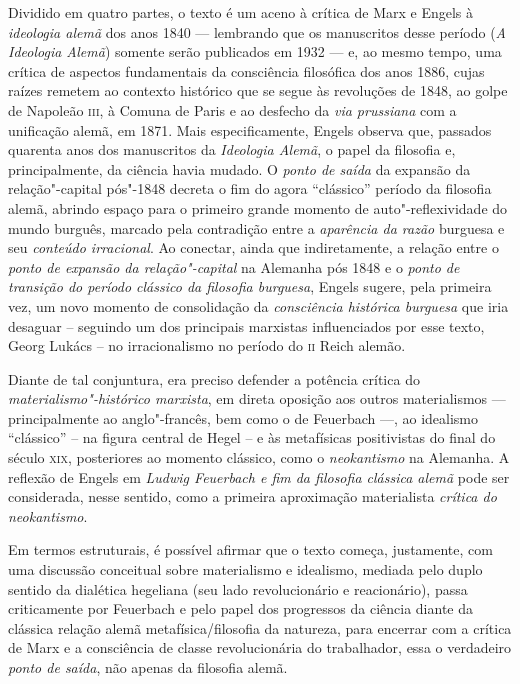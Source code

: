 Dividido em quatro partes, o texto é um aceno à
crítica de Marx e Engels à \emph{ideologia alemã} dos anos 1840 ---
lembrando que os manuscritos desse período (\emph{A Ideologia
Alemã}) somente serão publicados em 1932 --- e, ao mesmo tempo, uma crítica de aspectos
fundamentais da consciência filosófica dos anos 1886, cujas raízes remetem ao contexto histórico que se segue às
revoluções de 1848, ao golpe de Napoleão \textsc{iii}, à Comuna de Paris e
ao desfecho da \emph{via prussiana} com a unificação alemã, em 1871. Mais especificamente, Engels observa que, passados quarenta anos dos manuscritos da \emph{Ideologia Alemã}, o
papel da filosofia e, principalmente, da ciência havia mudado. O
\emph{ponto de saída} da expansão da relação"-capital pós"-1848 decreta o
fim do agora ``clássico'' período da filosofia alemã, abrindo espaço para
o primeiro grande momento de auto"-reflexividade do mundo burguês, marcado pela contradição entre a 
\emph{aparência da razão} burguesa e seu \emph{conteúdo irracional}. Ao
conectar, ainda que indiretamente, a relação entre o \emph{ponto de
expansão da relação"-capital} na Alemanha pós 1848 e o \emph{ponto de
transição do período clássico da filosofia burguesa}, Engels sugere,
pela primeira vez, um novo momento de consolidação da \emph{consciência
histórica burguesa} que iria desaguar -- seguindo um dos principais
marxistas influenciados por esse texto, Georg Lukács -- no irracionalismo
no período do \textsc{ii} Reich alemão.

Diante de tal conjuntura, era preciso defender a potência crítica do
\emph{materialismo"-histórico marxista}, em direta oposição aos outros
materialismos --- principalmente ao anglo"-francês, bem como o de Feuerbach ---, ao
idealismo ``clássico'' -- na figura central de Hegel -- e às metafísicas
positivistas do final do século \textsc{xix}, posteriores ao momento clássico,
como o \emph{neokantismo} na Alemanha. A reflexão de Engels em \emph{Ludwig Feuerbach e fim da filosofia clássica alemã} pode ser
considerada, nesse sentido, como a primeira aproximação materialista
\emph{crítica do neokantismo}.

Em termos estruturais, é possível afirmar que o texto começa, justamente,
com uma discussão conceitual sobre materialismo e idealismo, mediada
pelo duplo sentido da dialética hegeliana (seu lado revolucionário
e reacionário), passa criticamente por Feuerbach e pelo papel dos
progressos da ciência diante da clássica relação alemã
metafísica/filosofia da natureza, para encerrar com a crítica de Marx
e a consciência de classe revolucionária do trabalhador, essa o
verdadeiro \emph{ponto de saída}, não apenas da filosofia alemã.

